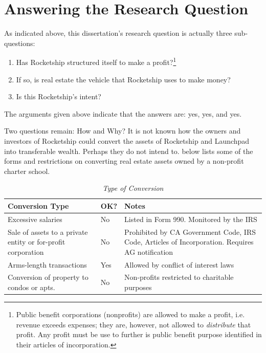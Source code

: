 \section{Answering the Research Question}%
\label{sec:answ-rese-quest}\indent%

As indicated above, this dissertation's research question is actually three sub-questions:
\begin{enumerate}
  \item Has Rocketship structured itself to make a profit?\footnote{Public benefit corporations (nonprofits) are allowed to make a profit, i.e. revenue exceeds expenses; they are, however, not allowed to \textit{distribute} that profit. Any profit must be use to further is public benefit purpose identified in their articles of incorporation.}
  \item If so, is real estate the vehicle that Rocketship uses to make money?
  \item Is this Rocketship's intent?
\end{enumerate}

The arguments given above indicate that the answers are: yes, yes, and yes.

Two questions remain: How and Why? It is not known how the owners and investors of Rocketship could convert the assets of Rocketship and Launchpad into transferable wealth. Perhaps they do not intend to.  below lists some of the forms and restrictions on converting real estate assets owned by a non-profit charter school.

\noindent%
\begin{table}[hbtp]
  \caption[Type of Conversion]{\textit{Type of Conversion}}%
  \label{tab:type_conversion}\OnehalfSpacing%
    \begin{tabulary}{\textwidth}{LLL}
    \toprule
    \textbf{Conversion Type} & \textbf{OK?} & \textbf{Notes} \\
    \midrule
    Excessive salaries & No & Listed in Form 990. Monitored by the IRS \vspace{6pt} \\
    Sale of assets to a private entity or for-profit corporation & No & Prohibited by CA Government Code, IRS Code, Articles of Incorporation. Requires AG notification \vspace{6pt} \\
    Arms-length transactions & Yes & Allowed by conflict of interest laws \vspace{6pt} \\
    Conversion of property to condos or apts. & No & Non-profits restricted to charitable purposes \\
    \bottomrule
  \end{tabulary}
\end{table}

